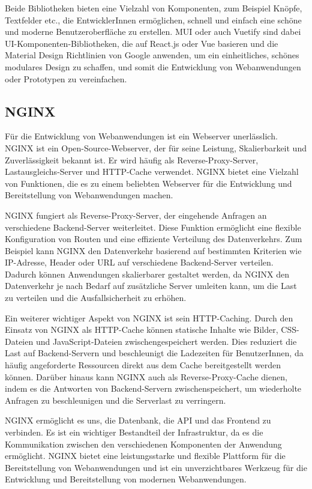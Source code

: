 Beide Bibliotheken bieten eine Vielzahl von Komponenten, zum Beispiel Knöpfe, Textfelder etc., die EntwicklerInnen ermöglichen, schnell und einfach eine schöne und moderne Benutzeroberfläche zu erstellen. \acf{MUI} oder auch Vuetify sind dabei \acs{UI}-Komponenten-Bibliotheken, die auf React.js oder Vue basieren und die Material Design Richtlinien von Google anwenden, um ein einheitliches, schönes modulares Design zu schaffen, und somit die Entwicklung von Webanwendungen oder Prototypen zu vereinfachen.\cite{materialui, vuetify}

\subsection{NGINX}

Für die Entwicklung von Webanwendungen ist ein Webserver unerlässlich. \acf{NGINX} ist ein Open-Source-Webserver, der für seine Leistung, Skalierbarkeit und Zuverlässigkeit bekannt ist. Er wird häufig als Reverse-Proxy-Server, Lastausgleichs-Server und HTTP-Cache verwendet. \acs{NGINX} bietet eine Vielzahl von Funktionen, die es zu einem beliebten Webserver für die Entwicklung und Bereitstellung von Webanwendungen machen.

\acs{NGINX} fungiert als Reverse-Proxy-Server, der eingehende Anfragen an verschiedene Backend-Server weiterleitet. Diese Funktion ermöglicht eine flexible Konfiguration von Routen und eine effiziente Verteilung des Datenverkehrs. Zum Beispiel kann \acs{NGINX} den Datenverkehr basierend auf bestimmten Kriterien wie IP-Adresse, Header oder URL auf verschiedene Backend-Server verteilen. Dadurch können Anwendungen skalierbarer gestaltet werden, da \acs{NGINX} den Datenverkehr je nach Bedarf auf zusätzliche Server umleiten kann, um die Last zu verteilen und die Ausfallsicherheit zu erhöhen.

Ein weiterer wichtiger Aspekt von \acs{NGINX} ist sein HTTP-Caching. Durch den Einsatz von \acs{NGINX} als HTTP-Cache können statische Inhalte wie Bilder, CSS-Dateien und JavaScript-Dateien zwischengespeichert werden. Dies reduziert die Last auf Backend-Servern und beschleunigt die Ladezeiten für BenutzerInnen, da häufig angeforderte Ressourcen direkt aus dem Cache bereitgestellt werden können. Darüber hinaus kann \acs{NGINX} auch als Reverse-Proxy-Cache dienen, indem es die Antworten von Backend-Servern zwischenspeichert, um wiederholte Anfragen zu beschleunigen und die Serverlast zu verringern.

\acs{NGINX} ermöglicht es uns, die Datenbank, die \acs{API} und das Frontend zu verbinden. Es ist ein wichtiger Bestandteil der Infrastruktur, da es die Kommunikation zwischen den verschiedenen Komponenten der Anwendung ermöglicht. \acs{NGINX} bietet eine leistungsstarke und flexible Plattform für die Bereitstellung von Webanwendungen und ist ein unverzichtbares Werkzeug für die Entwicklung und Bereitstellung von modernen Webanwendungen. \cite{nginx}

